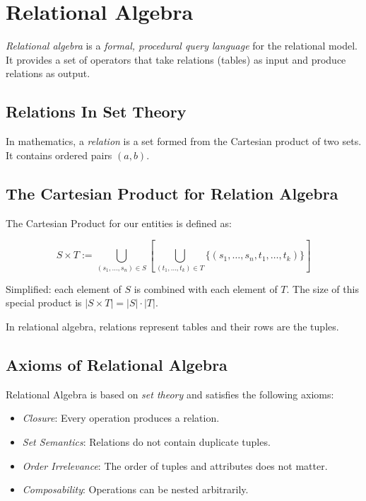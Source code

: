 \chapter{Relational Algebra}

\emph{Relational algebra} is a \emph{formal, procedural query language} for the relational model. It provides a set of operators that take relations (tables) as input and produce relations as output.

\section{Relations In Set Theory}

In mathematics, a \emph{relation} is a set formed from the Cartesian product of two sets. It contains ordered pairs \((a,b)\).

\section{The Cartesian Product for Relation Algebra}

The Cartesian Product for our entities is defined as:

\[
    S \times T := \bigcup_{(s_1, \dots, s_n) \in S} \left[ \bigcup_{(t_1, \dots, t_k) \in T} \{(s_1, \dots, s_n, t_1, \dots, t_k)\}\right]
\]

Simplified: each element of \(S\) is combined with each element of \(T\). The size of this
special product is \( |S \times T| = |S| \cdot |T| \).

In relational algebra, relations represent tables and their rows are the tuples.

\section{Axioms of Relational Algebra}

Relational Algebra is based on \emph{set theory} and satisfies the following axioms:

\begin{itemize}

    \item \emph{Closure}: Every operation produces a relation.

    \item \emph{Set Semantics}: Relations do not contain duplicate tuples.

    \item \emph{Order Irrelevance}: The order of tuples and attributes does not matter.

    \item \emph{Composability}: Operations can be nested arbitrarily.

\end{itemize}

